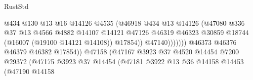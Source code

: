 \begin{lexlean}{RustStd}
\begin{coremodule}
                                                  @434
                                                  @130
                                                  @13
                                                  @16
                                                  @14126
                                                  @4535
                                                  (@46918
                                                    @434
                                                    @13
                                                    @14126
                                                    (@47080
                                                      @336
                                                      @37
                                                      @13
                                                      @4566
                                                      @4882
                                                      @14107
                                                      @14121
                                                      @47126
                                                      @46319
                                                      @46323
                                                      @30859
                                                      @18744
                                                      (@16007 (@19100 @14121 @14108))
                                                      @17854))
                                                  @47140)))))))
                                    @46373
                                    @46376
                                    @46379
                                    @46382
                                    @17854))
                                @47158
                                (@47167
                                  @3923
                                  @37
                                  @4520
                                  @14454
                                  @7200
                                  @29372
                                  (@47175
                                    @3923
                                    @37
                                    @14454
                                    (@47181
                                      @3922
                                      @13
                                      @36
                                      @14158
                                      @14453
                                      (@47190
                                        @14158

\end{coremodule}
\end{lexlean}
